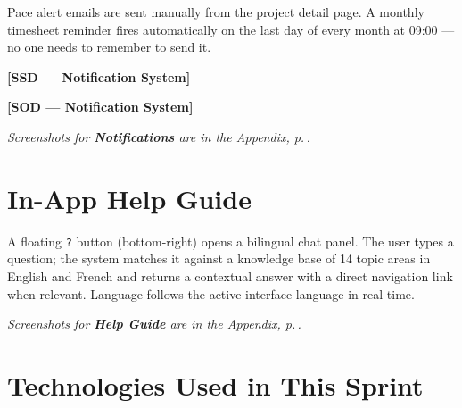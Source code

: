 \documentclass[12pt,a4paper]{report}
\newcommand{\ssd}[1]{\begin{placeholder}\textbf{[SSD --- #1]}\end{placeholder}\vspace{2pt}}
\newcommand{\sod}[1]{\begin{placeholder}\textbf{[SOD --- #1]}\end{placeholder}\vspace{4pt}}
\newcommand{\annexref}[1]{\begin{screenshotbox}\small\textit{Screenshots for \textbf{#1} are in the Appendix, p.\,\pageref{annex:#1}.}\end{screenshotbox}\vspace{4pt}}
\begin{document}
Pace alert emails are sent manually from the project detail page. A monthly timesheet
reminder fires automatically on the last day of every month at 09:00 --- no one needs
to remember to send it.

\ssd{Notification System}
\sod{Notification System}
\annexref{Notifications}

\section{In-App Help Guide}

A floating \texttt{?} button (bottom-right) opens a bilingual chat panel. The user
types a question; the system matches it against a knowledge base of 14 topic areas
in English and French and returns a contextual answer with a direct navigation link
when relevant. Language follows the active interface language in real time.

\annexref{Help Guide}

\section{Technologies Used in This Sprint}
\end{document}
